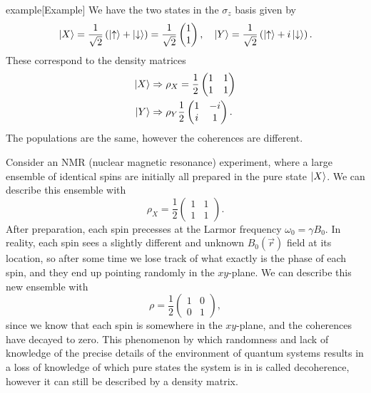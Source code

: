 \documentclass{article}
\begin{document}
\begin{callout}{example}[Example]
\label{example:s7-e2}
We have the two states in the $\sigma _z$ basis given by
\[
    \ket{X}=\frac{1}{\sqrt{2}}\left( \ket{\uparrow}+\ket{\downarrow} \right)=\frac{1}{\sqrt{ 2}}\begin{pmatrix}
        1 \\ 1
    \end{pmatrix},\quad \ket{Y}=\frac{1}{\sqrt{2}}\left( \ket{\uparrow}+i \ket{\downarrow} \right).
\]
These correspond to the density matrices
\begin{align*}
    \ket{X} &\Rightarrow \rho _X=\frac{1}{2}\begin{pmatrix}
        1 & 1 \\ 1 & 1
    \end{pmatrix} \\
        \ket{Y} &\Rightarrow \rho _Y \frac{1}{2}\begin{pmatrix}
            1 & -i \\ i & 1
        \end{pmatrix}.
\end{align*}
The populations are the same, however the coherences are different.
\end{callout}

Consider an NMR (nuclear magnetic resonance) experiment, where a large ensemble of identical spins are initially all prepared in the pure state $\ket{X}$. We can describe this ensemble with
\[
    \rho _X=\frac{1}{2}\begin{pmatrix}
        1 & 1 \\ 1 & 1
    \end{pmatrix}.
\]
After preparation, each spin precesses at the Larmor frequency $\omega _0=\gamma B_0$. In reality, each spin sees a slightly different and unknown $B_0(\vec{r})$ field at its location, so after some time we lose track of what exactly is the phase of each spin, and they end up pointing randomly in the $xy$-plane. We can describe this new ensemble with
\[
    \rho =\frac{1}{2}\begin{pmatrix}
        1 & 0 \\ 0 & 1
    \end{pmatrix},
\]
since we know that each spin is somewhere in the $xy$-plane, and the coherences have decayed to zero. This phenomenon by which randomness and lack of knowledge of the precise details of the environment of quantum systems results in a loss of knowledge of which pure states the system is in is called decoherence, however it can still be described by a density matrix.
\end{document}
